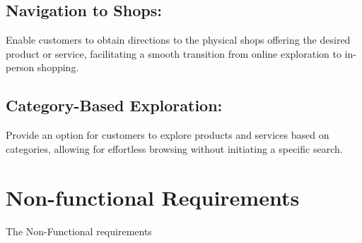 \subsection{Navigation to Shops:}
Enable customers to obtain directions to the physical shops offering the desired product or service, facilitating a smooth transition from online exploration to in-person shopping.

\subsection{Category-Based Exploration:}
Provide an option for customers to explore products and services based on categories, allowing for effortless browsing without initiating a specific search.



\section{Non-functional Requirements}
The Non-Functional requirements 




